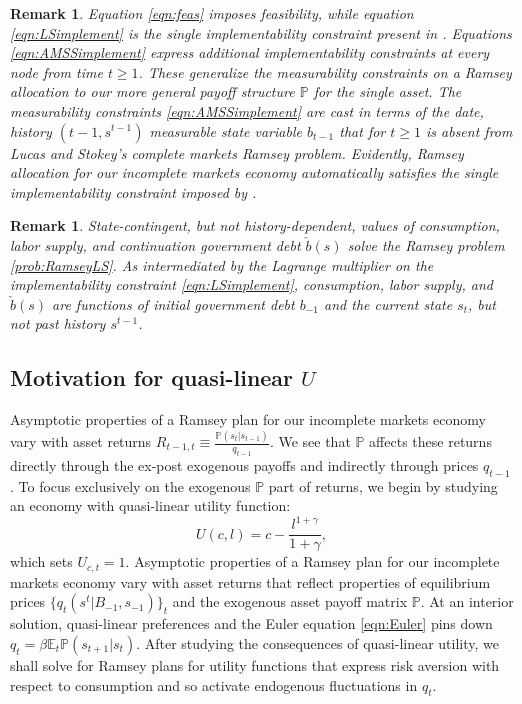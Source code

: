 \documentclass[12pt]{article}
\newtheorem{remark}[theorem]{Remark}
\begin{document}
\begin{remark} Equation \eqref{eqn:feas} imposes feasibility, while equation  \eqref{eqn:LSimplement} is the single implementability constraint
present in \citet{LucasJr.1983}.  Equations \eqref{eqn:AMSSimplement} express  additional
 implementability constraints at every node from time $t \geq 1$. These generalize the \citet{Aiyagari2002} measurability constraints on a Ramsey allocation  to our more general payoff structure ${\mathbb P}$ for the
single asset. The measurability constraints \eqref{eqn:AMSSimplement}  are cast
in terms of the date, history $(t-1, s^{t-1})$ measurable state variable $b_{t-1}$ that for $t \geq 1$ is absent from Lucas and Stokey's complete markets Ramsey problem.  Evidently, Ramsey allocation for our incomplete markets economy automatically satisfies the single implementability constraint imposed by \citeauthor{LucasJr.1983}.
\end{remark}


\begin{remark}\label{rem:LSdebt}
State-contingent, but not history-dependent,  values of consumption, labor supply, and continuation government debt $\check b(s)$ solve the \citet{LucasJr.1983} Ramsey problem \ref{prob:RamseyLS}.  As intermediated by the Lagrange multiplier on the implementability constraint \eqref{eqn:LSimplement},
consumption, labor supply, and $\check b(s)$ are  functions of initial government debt $b_{-1}$ and the current state $s_t$, but not past history $s^{t-1}$.
\end{remark}

\subsection{Motivation for  quasi-linear $U$\label{sec:excusequasilinear}}
Asymptotic properties of a Ramsey plan for our incomplete markets economy vary  with asset returns $R_{t-1,t}\equiv \frac{\mathbb{P}(s_{t}|s_{t-1})}{q_{t-1}}$. We see that $\mathbb{P}$ affects these returns directly through the ex-post exogenous payoffs and indirectly through prices $q_{t-1}$. To focus exclusively on the exogenous $\mathbb{P}$ part of returns, we begin  by studying an economy with  quasi-linear  utility function:
  \begin{equation}\label{eqn:UQL}
U(c,l)=c-\frac{l^{1+\gamma}}{1+\gamma},\end{equation} which sets $U_{c,t}= 1$.  Asymptotic properties of a Ramsey plan for our incomplete markets economy vary  with   asset returns that reflect
	properties of equilibrium prices $\{q_t(s^t|B_{-1},s_{-1})\}_t$ and the exogenous asset payoff matrix $\mathbb{P}$.
At an interior solution, quasi-linear preferences and the Euler equation \eqref{eqn:Euler} pins down $q_t=\beta \mathbb{E}_t
\mathbb{P}(s_{t+1}|s_t)$.  After studying the consequences of quasi-linear utility, we shall solve for Ramsey plans for utility functions that express risk aversion with respect to consumption and so activate endogenous fluctuations in $q_t$.
	
\end{document}
